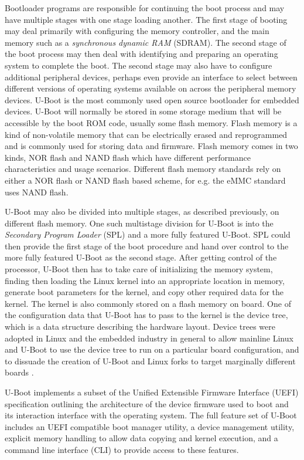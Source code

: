 Bootloader programs are responsible for continuing the boot process and may have multiple stages with one stage loading another. The first stage of booting may deal primarily with configuring the memory controller, and the main memory such as a \textit{synchronous dynamic RAM} (SDRAM). The second stage of the boot process may then deal with identifying and preparing an operating system to complete the boot. The second stage may also have to configure additional peripheral devices, perhaps even provide an interface to select between different versions of operating systems available on across the peripheral memory devices. U-Boot is the most commonly used open source bootloader for embedded devices. U-Boot will normally be stored in some storage medium that will be accessible by the boot ROM code, usually some flash memory. Flash memory is a kind of non-volatile memory that can be electrically erased and reprogrammed and is commonly used for storing data and firmware. Flash memory comes in two kinds, NOR flash and NAND flash which have different performance characteristics and usage scenarios. Different flash memory standards rely on either a NOR flash or NAND flash based scheme, for e.g. the eMMC standard uses NAND flash.

U-Boot may also be divided into multiple stages, as described previously, on different flash memory. One such multistage division for U-Boot is into the \textit{Secondary Program Loader} (SPL) and a more fully featured U-Boot. SPL could then provide the first stage of the boot procedure and hand over control to the more fully featured U-Boot as the second stage. After getting control of the processor, U-Boot then has to take care of initializing the memory system, finding then loading the Linux kernel into an appropriate location in memory, generate boot parameters for the kernel, and copy other required data for the kernel. The kernel is also commonly stored on a flash memory on board. One of the configuration data that U-Boot has to pass to the kernel is the device tree, which is a data structure describing the hardware layout. Device trees were adopted in Linux and the embedded industry in general to allow mainline Linux and U-Boot to use the device tree to run on a particular board configuration, and to dissuade the creation of U-Boot and Linux forks to target marginally different boards \cite{device-tree}.

U-Boot implements a subset of the Unified Extensible Firmware Interface (UEFI) specification outlining the architecture of the device firmware used to boot and its interaction interface with the operating system. The full feature set of U-Boot includes an UEFI compatible boot manager utility, a device management utility, explicit memory handling to allow data copying and kernel execution, and a command line interface (CLI) to provide access to these features.

